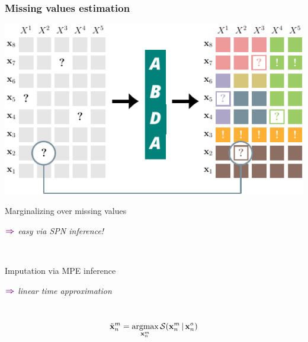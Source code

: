 \documentclass[xcolor={usenames,dvipsnames,svgnames}, compress, aspectratio=169, 11pt]{beamer}
\newcommand{\argmax}{\operatornamewithlimits{argmax}}
\newcommand{\cndbar}{\,|\,}
\newcommand{\SPN}{\mathcal{S}}
\newcommand{\x}{\mathbf{x}}
\newcommand{\comment}[3][\small]{\begin{minipage}{1\linewidth}
          \raggedleft
          {
            $\color{violet}\boldsymbol\Rightarrow$
            #1
            {\emph{#2}}
          }
      \end{minipage}#3\\
}
\begin{document}
\begin{frame}[t, htt=bgrey2]
  \frametitle{Missing values estimation}

  \large
  \begin{minipage}[t]{0.5\linewidth}
    \vspace{10pt}
    \includegraphics[width=1.1\linewidth]{figures/abda-miss}
  \end{minipage}\hfill\begin{minipage}[t]{0.4\linewidth}
    \raggedright
    \vspace{10pt}
    Marginalizing over missing values\\
    \comment{easy via SPN inference!}{}
    \vspace{15pt}

    Imputation via MPE inference\\
    \comment{linear time approximation}{}
    \vspace{-10pt}
    $$\tilde{\x}_{n}^{m}=\argmax_{\x_{n}^{m}}\SPN(\x_{n}^{m} \cndbar \x_{n}^{o})$$
    
  \end{minipage}  
\end{frame}
\end{document}
